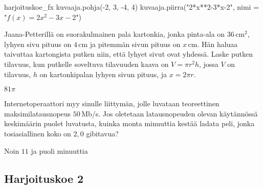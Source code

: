 \begin{luoKuva}{harjoituskoe_fx}
    kuvaaja.pohja(-2, 3, -4, 4)
    kuvaaja.piirra("2*x**2-3*x-2", nimi = "$f(x)=2x^2-3x-2$")
\end{luoKuva}

\begin{tehtava}
	\begin{vastaus}
	\end{vastaus}
		\begin{center}
			\naytaKuva{harjoituskoe_fx}
		\end{center}
\end{tehtava}

\begin{tehtava}
Jaana-Petterillä on suorakulmainen pala kartonkia, jonka pinta-ala on $36$\,cm$^2$, lyhyen sivu pituus on $4$\,cm ja pitemmän sivun pituus on $x$\,cm. Hän haluaa taivuttaa kartongista putken niin, että lyhyet sivut ovat yhdessä. Laske putken tilavuus, kun putkelle soveltuva tilavuuden kaava on $V=\pi r^2 h$, jossa $V$ on tilavuus, $h$ on kartonkipalan lyhyen sivun pituus, ja $x=2\pi r$.    
	\begin{vastaus}
$81\pi$
	\end{vastaus}
\end{tehtava}

\begin{tehtava}
Internetoperaattori myy sinulle liittymän, jolle luvataan teoreettinen maksimilatausnopeus $50$\,Mb/s. Jos oletetaan latausnopeuden olevan käytännössä keskimäärin puolet luvatusta, kuinka monta minuuttia kestää ladata peli, jonka tosiasiallinen koko on $2,0$ gibitavua?
	\begin{vastaus}
Noin $11$ ja puoli minuuttia
	\end{vastaus}
\end{tehtava}


\newpage

\subsection*{Harjoituskoe 2}


